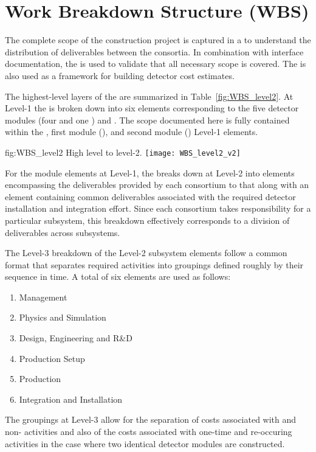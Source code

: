 \section{Work Breakdown Structure (WBS)}
\label{sec:fdsp-coord-wbs}

The complete scope of the  construction project is captured in a 
 to understand the distribution of deliverables between 
the consortia.  In combination with interface documentation, the 
 is used to validate that all necessary scope is covered.  The 
 is also used as a framework for building  
detector cost estimates.

The highest-level layers of the   are summarized 
in Table~\ref{fig:WBS_level2}.  At Level-1 the  is broken down into 
six elements corresponding to the five  detector modules (four 
 and one ) and .  The scope documented
here is fully contained within the , first  module 
(), and second  module () Level-1 elements.   
\begin{dunefigure}{fig:WBS_level2}
  {High level   to level-2.}
  \texttt{[image: WBS\_level2\_v2]}
\end{dunefigure}

For the  module elements at Level-1, the  breaks 
down at Level-2 into elements encompassing the deliverables provided by 
each consortium to that  along with an element containing 
common deliverables associated with the required detector installation 
and integration effort.  Since each consortium takes responsibility 
for a particular subsystem, this breakdown effectively corresponds to 
a division of deliverables across subsystems. 

The Level-3 breakdown of the Level-2 subsystem  elements follow 
a common format that separates required activities into groupings defined 
roughly by their sequence in time.  A total of six elements are used as 
follows:     
\begin{enumerate}
  \item Management
  \item Physics and Simulation
  \item Design, Engineering and R\&D
  \item Production Setup
  \item Production
  \item Integration and Installation
\end{enumerate}
The groupings at Level-3 allow for the separation of costs associated with 
 and non- activities and also of the costs associated with one-time 
and re-occuring activities in the case where two identical detector modules
are constructed.   

